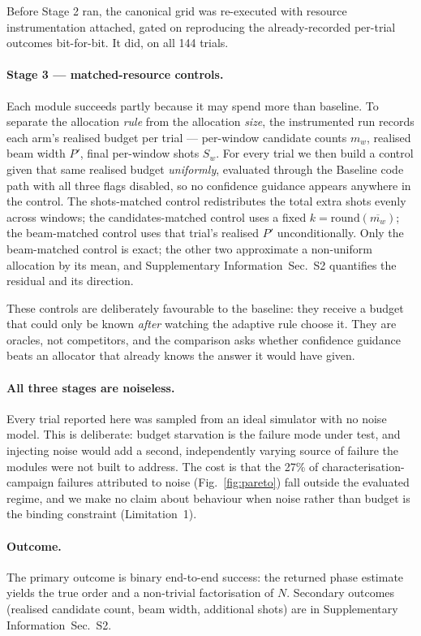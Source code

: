\documentclass[preprint,11pt]{elsarticle}
\newcommand{\SI}{Supplementary Information}
\newcommand{\SItables}{\SI{}~Sec.~S2}
\begin{document}
Before Stage 2 ran, the canonical grid was re-executed with resource
instrumentation attached, gated on reproducing the already-recorded
per-trial outcomes bit-for-bit. It did, on all 144 trials.

\paragraph{Stage 3 --- matched-resource controls.} Each module succeeds
partly because it may spend more than baseline. To separate the
allocation \emph{rule} from the allocation \emph{size}, the instrumented
run records each arm's realised budget per trial --- per-window candidate
counts $m_w$, realised beam width $P'$, final per-window shots $S_w$. For
every trial we then build a control given that same realised budget
\emph{uniformly}, evaluated through the Baseline code path with all three
flags disabled, so no confidence guidance appears anywhere in the
control. The shots-matched control redistributes the total extra shots
evenly across windows; the candidates-matched control uses a fixed
$k=\mathrm{round}(\overline{m_w})$; the beam-matched control uses that
trial's realised $P'$ unconditionally. Only the beam-matched control is
exact; the other two approximate a non-uniform allocation by its mean,
and \SItables{} quantifies the residual and its direction.

These controls are deliberately favourable to the baseline: they receive
a budget that could only be known \emph{after} watching the adaptive rule
choose it. They are oracles, not competitors, and the comparison asks
whether confidence guidance beats an allocator that already knows the
answer it would have given.

\paragraph{All three stages are noiseless.} Every trial reported here was
sampled from an ideal simulator with no noise model. This is deliberate:
budget starvation is the failure mode under test, and injecting noise
would add a second, independently varying source of failure the modules
were not built to address. The cost is that the 27\% of
characterisation-campaign failures attributed to noise
(Fig.~\ref{fig:pareto}) fall outside the evaluated regime, and we make no
claim about behaviour when noise rather than budget is the binding
constraint (Limitation~1).

\paragraph{Outcome.} The primary outcome is binary end-to-end success:
the returned phase estimate yields the true order and a non-trivial
factorisation of $N$. Secondary outcomes (realised candidate count, beam
width, additional shots) are in \SItables{}.
\end{document}
